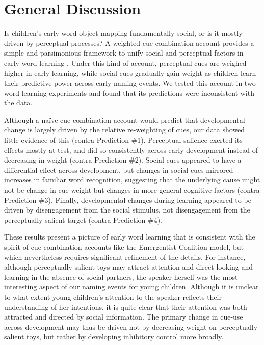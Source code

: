 \documentclass[man,floatsintext]{apa6}
\begin{document}
\section{General Discussion}

Is children's early word-object mapping fundamentally social, or is it mostly driven by perceptual processes? A weighted cue-combination account provides a simple and parsimonious framework to unify social and perceptual factors in early word learning \cite{Hollich2000,Yu2007b,Frank2013a}. Under this kind of account, perceptual cues are weighed higher in early learning, while social cues gradually gain weight as children learn their predictive power across early naming events. We tested this account in two word-learning experiments and found that its predictions were inconsistent with the data. 

Although a na\"{i}ve cue-combination account would predict that developmental change is largely driven by the relative re-weighting of cues, our data showed little evidence of this (contra Prediction \#1). Perceptual salience exerted its effects mostly at test, and did so consistently across early development instead of decreasing in weight (contra Prediction \#2). Social cues appeared to have a differential effect across development, but changes in social cues mirrored increases in familiar word recognition, suggesting that the underlying cause might not be change in cue weight but changes in more general cognitive factors (contra Prediction \#3). Finally, developmental changes during learning appeared to be driven by disengagement from the social stimulus, not disengagement from the perceptually salient target (contra Prediction \#4). 

These results present a picture of early word learning that is consistent with the spirit of cue-combination accounts like the Emergentist Coalition model, but which nevertheless requires significant refinement of the details. For instance, although perceptually salient toys may attract attention and direct looking and learning in the absence of social partners, the speaker herself was the most interesting aspect of our naming events for young children. Although it is unclear to what extent young children's attention to the speaker reflects their understanding of her intentions, it is quite clear that their attention was both attracted and directed by social information. The primary change in cue-use across development may thus be driven not by decreasing weight on perceptually salient toys, but rather by developing inhibitory control more broadly.
\end{document}
